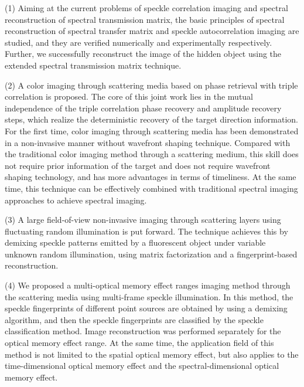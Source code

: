\begin{englishabstract}
(1) Aiming at the current problems of speckle correlation imaging and spectral reconstruction of spectral transmission matrix, the basic principles of spectral reconstruction of spectral transfer matrix and speckle autocorrelation imaging are studied, and they are verified numerically and experimentally respectively. Further, we successfully reconstruct the image of the hidden object using the extended spectral transmission matrix technique.

(2) A color imaging through scattering media based on phase retrieval with triple correlation is proposed. The core of this joint work lies in the mutual independence of the triple correlation phase recovery and amplitude recovery steps, which realize the deterministic recovery of the target direction information. For the first time, color imaging through scattering media has been demonstrated in a non-invasive manner without wavefront shaping technique. Compared with the traditional color imaging method through a scattering medium, this skill does not require prior information of the target and does not require wavefront shaping technology, and has more advantages in terms of timeliness. At the same time, this technique can be effectively combined with traditional spectral imaging approaches to achieve spectral imaging.

(3) A large field-of-view non-invasive imaging through scattering layers using fluctuating random illumination is put forward. The technique achieves this by demixing speckle patterns emitted by a fluorescent object under variable unknown random illumination, using matrix factorization and a fingerprint-based reconstruction.

(4) We proposed a multi-optical memory effect ranges imaging method through the scattering media using multi-frame speckle illumination. In this method, the speckle fingerprints of different point sources are obtained by using a demixing algorithm, and then the speckle fingerprints are classified by the speckle classification method. Image reconstruction was performed separately for the optical memory effect range. At the same time, the application field of this method is not limited to the spatial optical memory effect, but also applies to the time-dimensional optical memory effect and the spectral-dimensional optical memory effect.
\\
 \\

\end{englishabstract}


